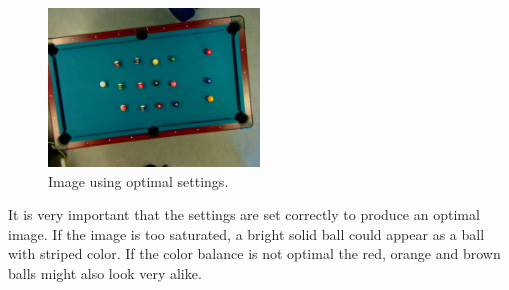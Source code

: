 \begin{figure}[htpb]
\begin{center}
\leavevmode
\includegraphics[width=0.5\textwidth]{images/good-from-program}
\end{center}
\caption{Image using optimal settings.}
\label{fig:bestimgcamera}
\end{figure} 

It is very important that the settings are set correctly to produce an optimal image. If the image is too saturated, a bright solid ball could appear as a ball with striped color. If the color balance is not optimal the red, orange and brown balls might also look very alike.